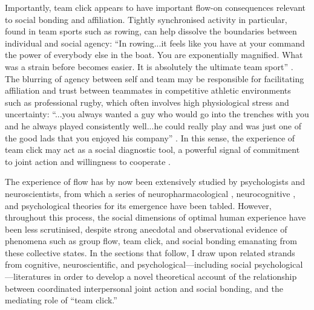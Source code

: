 \begin{CJK}{UTF8}{gbsn}
Importantly, team click appears to have important flow-on consequences relevant to social bonding and affiliation. Tightly synchronised activity in particular, found in team sports such as rowing, can help dissolve the boundaries between individual and social agency: ``In rowing...it feels like you have at your command the power of everybody else in the boat. You are exponentially magnified. What was a strain before becomes easier. It is absolutely the ultimate team sport'' \citep{Brown2016}.
The blurring of agency between self and team may be responsible for facilitating affiliation and trust between teammates in competitive athletic environments such as professional rugby, which often involves high physiological stress and uncertainty: ``...you always wanted a guy who would go into the trenches with you and he always played consistently well...he could really play and was just one of the good lads that you enjoyed his company'' \citep{Fox-Sports2017}. In this sense, the experience of team click may act as a social diagnostic tool, a powerful signal of commitment to joint action and willingness to cooperate \citep{Reddish2013a}.

The experience of flow has by now been extensively studied by psychologists and neuroscientists, from which a series of neuropharmacological \citep{Boecker2008}, neurocognitive \citep{Dietrich2006,Dietrich2011,Labelle2013}, and psychological \citep{Csikszentmihalyi1992} theories for its emergence have been tabled.  However, throughout this process, the social dimensions of optimal human experience have been less scrutinised, despite strong anecdotal and observational evidence of phenomena such as group flow, team click, and social bonding emanating from these collective states. In the sections that follow, I draw upon related strands from cognitive, neuroscientific, and psychological---including social psychological---literatures in order to develop a novel theoretical account of the relationship between coordinated interpersonal joint action and social bonding, and the mediating role of ``team click.''













\end{CJK}
